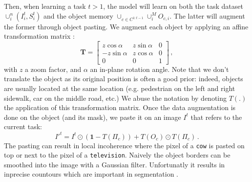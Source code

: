 Then, when learning a task $t > 1$, the model will learn on both the task dataset $\cup_i^n (I^t_i,
    S^t_i)$ and the object memory $\cup_{c \in C^{1:t-1}} \cup_i^M O_{c,i}$. The latter will augment
the former through object pasting. We augment each object by applying an affine transformation
matrix \cite{fang2019instaboost}:
%
\begin{equation}
    \mathbf{T}=\left[\begin{array}{ccc}
            z \cos \alpha  & z \sin \alpha & 0 \\
            -z \sin \alpha & z \cos \alpha & 0 \\
            0              & 0             & 1
        \end{array}\right]\,,
    \label{eq:seg_transformation_matrix_complex}
\end{equation}
%
\noindent with $z$ a zoom factor, and $\alpha$ an in-plane rotation angle. Note that we don't
translate the object as its original position is often a good prior: indeed, objects are usually
located at the same location (e.g. pedestrian on the left and right sidewalk, car on the middle
road, etc.) We abuse the notation by denoting $T(.)$ the application of this transformation matrix.
Once the data augmentation is done on the object (and its mask), we paste it on an image $I^t$ that
refers to the current task:
%
\begin{equation}
    {I'}^t = I^t \odot (\mathbf{1} - T(\Pi_c)) + T(O_c) \odot T(\Pi_c)\,.
    \label{eq:seg_pasting}
\end{equation}
%
The pasting can result in local incoherence where the pixel of a \texttt{cow} is pasted on top or
next to the pixel of a \texttt{television}. Naively the object borders can be smoothed into the
image with a Gaussian filter. Unfortunatly it results in inprecise countours which are important in
segmentation \cite{chen2020semeda}.

